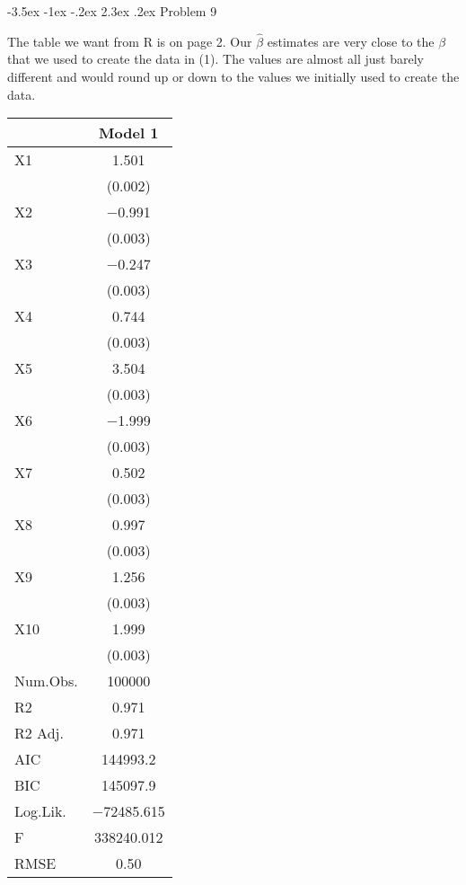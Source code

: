 \documentclass[12pt]{article}
\makeatletter
\renewcommand\section{\@startsection {section}{1}{\z@}%
                                       {-3.5ex \@plus -1ex \@minus -.2ex}%
                                       {2.3ex \@plus.2ex}%
                                       {\normalfont\fontfamily{phv}\fontsize{16}{19}\bfseries}}
\makeatother
\begin{document}
\section{Problem 9}

The table we want from R is on page 2. Our $\hat{\beta}$ estimates are very close to the $\beta$ that we used to create the data in (1). The values are almost all just barely different and would round up or down to the values we initially used to create the data. 

\begin{table}
\centering
\begin{tabular}[t]{lc}
\toprule
  & Model 1\\
\midrule
X1 & \num{1.501}\\
 & (\num{0.002})\\
X2 & \num{-0.991}\\
 & \vphantom{8} (\num{0.003})\\
X3 & \num{-0.247}\\
 & \vphantom{7} (\num{0.003})\\
X4 & \num{0.744}\\
 & \vphantom{6} (\num{0.003})\\
X5 & \num{3.504}\\
 & \vphantom{5} (\num{0.003})\\
X6 & \num{-1.999}\\
 & \vphantom{4} (\num{0.003})\\
X7 & \num{0.502}\\
 & \vphantom{3} (\num{0.003})\\
X8 & \num{0.997}\\
 & \vphantom{2} (\num{0.003})\\
X9 & \num{1.256}\\
 & \vphantom{1} (\num{0.003})\\
X10 & \num{1.999}\\
 & (\num{0.003})\\
\midrule
Num.Obs. & \num{100000}\\
R2 & \num{0.971}\\
R2 Adj. & \num{0.971}\\
AIC & \num{144993.2}\\
BIC & \num{145097.9}\\
Log.Lik. & \num{-72485.615}\\
F & \num{338240.012}\\
RMSE & \num{0.50}\\
\bottomrule
\end{tabular}
\end{table}
\end{document}
